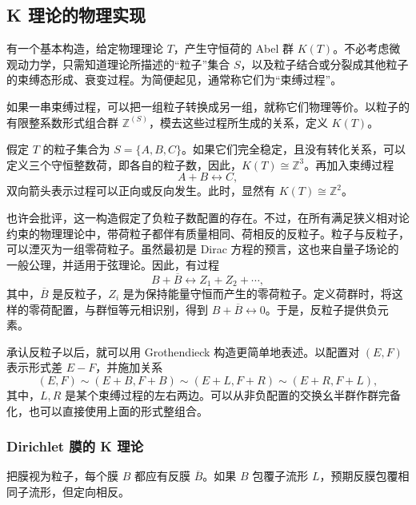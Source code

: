 \subsection{K 理论的物理实现}\label{sec:5.1.1}

有一个基本构造，给定物理理论 $T$，产生守恒荷的 Abel 群 $K(T)$。不必考虑微观动力学，只需知道理论所描述的“粒子”集合 $S$，以及粒子结合或分裂成其他粒子的束缚态形成、衰变过程。为简便起见，通常称它们为“束缚过程”。

如果一串束缚过程，可以把一组粒子转换成另一组，就称它们物理等价。以粒子的有限整系数形式组合群 $\mathbb{Z}^{(S)}$，模去这些过程所生成的关系，定义 $K(T)$。

\begin{example*}
假定 $T$ 的粒子集合为 $S=\{A,B,C\}$。如果它们完全稳定，且没有转化关系，可以定义三个守恒整数荷，即各自的粒子数，因此，$K(T)\cong\mathbb{Z}^3$。再加入束缚过程
\begin{equation}\label{eq:5.1}
A+B\longleftrightarrow C,
\end{equation}
双向箭头表示过程可以正向或反向发生。此时，显然有 $K(T)\cong\mathbb{Z}^2$。
\end{example*}

也许会批评，这一构造假定了负粒子数配置的存在。不过，在所有满足狭义相对论约束的物理理论中，带荷粒子都伴有质量相同、荷相反的反粒子。粒子与反粒子，可以湮灭为一组零荷粒子。虽然最初是 Dirac 方程的预言，这也来自量子场论的一般公理，并适用于弦理论。因此，有过程
\[
B+\overline B\longleftrightarrow Z_1+Z_2+\cdots,
\]
其中，$\overline B$ 是反粒子，$Z_i$ 是为保持能量守恒而产生的零荷粒子。定义荷群时，将这样的零荷配置，与群恒等元相识别，得到 $B+\overline B\longleftrightarrow0$。于是，反粒子提供负元素。

承认反粒子以后，就可以用 Grothendieck 构造更简单地表述。以配置对 $(E,F)$ 表示形式差 $E-F$，并施加关系
\[
(E,F)\sim(E+B,F+B)
\sim(E+L,F+R)\sim(E+R,F+L),
\]
其中，$L,R$ 是某个束缚过程的左右两边。可以从非负配置的交换幺半群作群完备化，也可以直接使用上面的形式整组合。

\subsubsection{Dirichlet 膜的 K 理论}\label{sec:5.1.1.1}

把膜视为粒子，每个膜 $B$ 都应有反膜 $\overline B$。如果 $B$ 包覆子流形 $L$，预期反膜包覆相同子流形，但定向相反。

